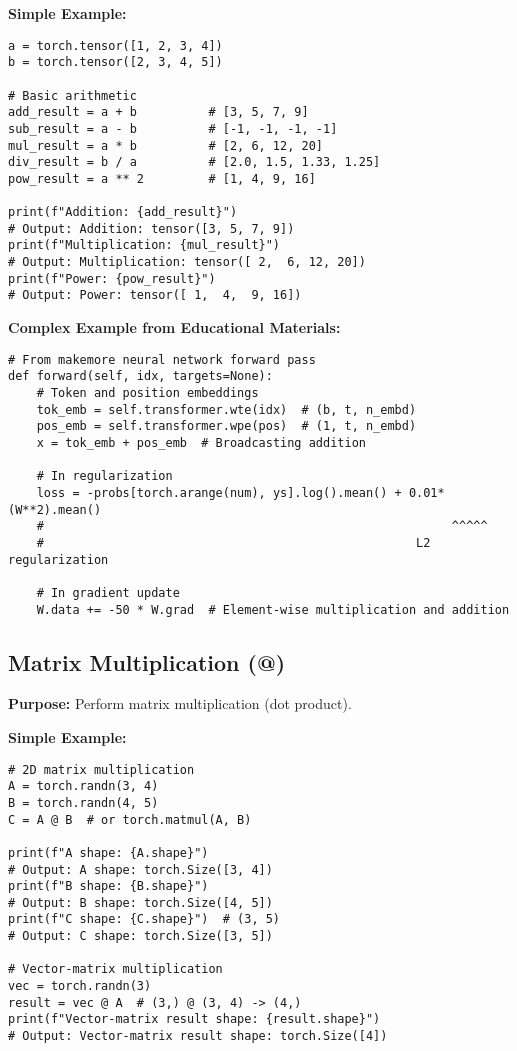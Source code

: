 \documentclass[11pt,a4paper]{book}
\begin{document}
\textbf{Simple Example:}
\begin{verbatim}
a = torch.tensor([1, 2, 3, 4])
b = torch.tensor([2, 3, 4, 5])

# Basic arithmetic
add_result = a + b          # [3, 5, 7, 9]
sub_result = a - b          # [-1, -1, -1, -1]
mul_result = a * b          # [2, 6, 12, 20]
div_result = b / a          # [2.0, 1.5, 1.33, 1.25]
pow_result = a ** 2         # [1, 4, 9, 16]

print(f"Addition: {add_result}")
# Output: Addition: tensor([3, 5, 7, 9])
print(f"Multiplication: {mul_result}")
# Output: Multiplication: tensor([ 2,  6, 12, 20])
print(f"Power: {pow_result}")
# Output: Power: tensor([ 1,  4,  9, 16])
\end{verbatim}

\textbf{Complex Example from Educational Materials:}
\begin{verbatim}
# From makemore neural network forward pass
def forward(self, idx, targets=None):
    # Token and position embeddings
    tok_emb = self.transformer.wte(idx)  # (b, t, n_embd)
    pos_emb = self.transformer.wpe(pos)  # (1, t, n_embd)
    x = tok_emb + pos_emb  # Broadcasting addition
    
    # In regularization
    loss = -probs[torch.arange(num), ys].log().mean() + 0.01*(W**2).mean()
    #                                                         ^^^^^
    #                                                    L2 regularization
    
    # In gradient update
    W.data += -50 * W.grad  # Element-wise multiplication and addition
\end{verbatim}

\subsection{Matrix Multiplication (@)}

\textbf{Purpose:} Perform matrix multiplication (dot product).

\textbf{Simple Example:}
\begin{verbatim}
# 2D matrix multiplication
A = torch.randn(3, 4)
B = torch.randn(4, 5)
C = A @ B  # or torch.matmul(A, B)

print(f"A shape: {A.shape}")
# Output: A shape: torch.Size([3, 4])
print(f"B shape: {B.shape}")
# Output: B shape: torch.Size([4, 5])
print(f"C shape: {C.shape}")  # (3, 5)
# Output: C shape: torch.Size([3, 5])

# Vector-matrix multiplication
vec = torch.randn(3)
result = vec @ A  # (3,) @ (3, 4) -> (4,)
print(f"Vector-matrix result shape: {result.shape}")
# Output: Vector-matrix result shape: torch.Size([4])
\end{verbatim}
\end{document}
